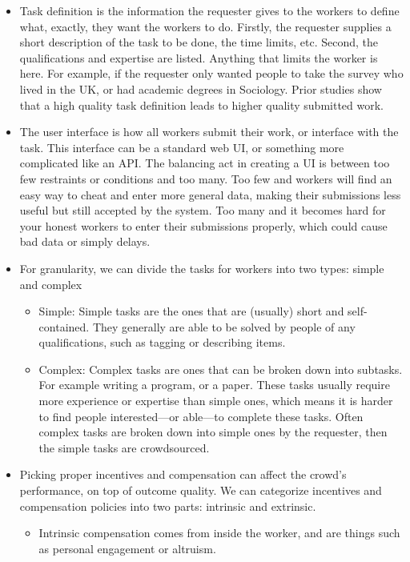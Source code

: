 \documentclass{sig-alternate-05-2015}
\begin{document}
	\begin{itemize}
		\item Task definition is the information the requester gives to the workers to define what, exactly, they want the workers to do. Firstly, the requester supplies a short description of the task to be done, the time limits, etc. \cite{chen2011opportunities}
		Second, the qualifications and expertise are listed. Anything that limits the worker is here. For example, if the requester only wanted people to take the survey who lived in the UK, or had academic degrees in Sociology. Prior studies show that a high quality task definition leads to higher quality submitted work. \cite{chen2011opportunities}
		
		\item The user interface is how all workers submit their work, or interface with the task. This interface can be a standard web UI, or something more complicated like an API. The balancing act in creating a UI is between too few restraints or conditions and too many. Too few and workers will find an easy way to cheat and enter more general data, making their submissions less useful but still accepted by the system. \cite{allahbakhsh2013quality} Too many and it becomes hard for your honest workers to enter their submissions properly, which could cause bad data or simply delays.
		
		\item For granularity, we can divide the tasks for workers into two types: simple and complex
		\begin{itemize}
			\item Simple: Simple tasks are the ones that are (usually) short and self-contained. They generally are able to be solved by people of any qualifications, such as tagging or describing items. \cite{kittur2011crowdforge} 
			
			\item Complex: Complex tasks are ones that can be broken down into subtasks. For example writing a program, or a paper. These tasks usually require more experience or expertise than simple ones, which means it is harder to find people interested---or able---to complete these tasks. Often complex tasks are broken down into simple ones by the requester, then the simple tasks are crowdsourced.
		\end{itemize}
		
		\item Picking proper incentives and compensation can affect the crowd's performance, on top of outcome quality. \cite{scekic2012modeling}\cite{dow2012shepherding} We can categorize incentives and compensation policies into two parts: intrinsic and extrinsic.
		\begin{itemize}
			\item Intrinsic compensation comes from inside the worker, and are things such as personal engagement or altruism. 
			

\end{itemize}
\end{itemize}
\end{document}
